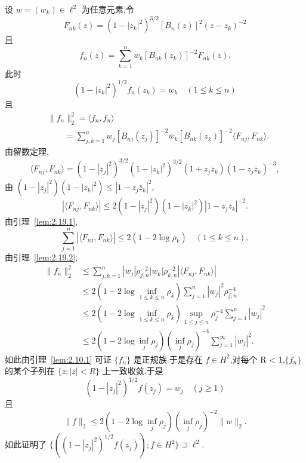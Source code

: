 设 $w = (w_{k}) \in \ell^{2}$ 为任意元素,令
\begin{equation*}
F_{nk}(z) = (1 - |z_{k}|^{2})^{3/2}[B_{n}(z)]^{2}(z - z_{k})^{-2}
\end{equation*}
且
\begin{equation*}
f_{n}(z) = \sum_{k=1}^{n} w_{k}[B_{nk}(z_{k})]^{-2}F_{nk}(z).
\end{equation*}
此时
\begin{equation*}
(1 - |z_{k}|^{2})^{1/2}f_{n}(z_{k}) = w_{k} \quad (1 \leq k \leq n)
\end{equation*}
且
\begin{align*}
& \|f_{n}\|_{2}^{2} = \langle f_{n}, f_{n} \rangle \\
& \qquad = \sum_{j,k=1}^{n} w_{j}[B_{nj}(z_{j})]^{-2}\bar{w}_{k}[\overline{B_{nk}}(z_{k})]^{-2}\langle F_{nj}, F_{nk} \rangle .
\end{align*}
由留数定理,
\begin{equation*}
\langle F_{nj}, F_{nk} \rangle = (1 - |z_{j}|^{2})^{3/2}(1 - |z_{k}|^{2})^{3/2}(1 + z_{j}\bar{z}_{k})(1 - z_{j}\bar{z}_{k})^{-3},
\end{equation*}
由 $(1 - |z_{j}|^{2})(1 - |z_{k}|^{2}) \leq |1 - z_{j}\bar{z}_{k}|^{2}$,
\begin{equation*}
|\langle F_{nj}, F_{nk} \rangle| \leq 2(1 - |z_{j}|^{2})(1 - |z_{k}|^{2})|1 - z_{j}\bar{z}_{k}|^{-2}.
\end{equation*}
由引理~\ref{lem:2.19.1},
\begin{equation*}
\sum_{j=1}^{n}|\langle F_{nj}, F_{nk} \rangle| \leq 2(1 - 2\log\rho_{k}) \quad (1 \leq k \leq n),
\end{equation*}
由引理~\ref{lem:2.19.2},
\begin{align*}
\|f_{n}\|_{2}^{2} &\leq \sum_{j,k=1}^{n}|w_{j}|\rho_{j,n}^{-2}|w_{k}|\rho_{k,n}^{-2}|\langle F_{nj}, F_{nk} \rangle| \\
&\leq 2(1 - 2\log\inf_{1 \leq k \leq n}\rho_{k})\sum_{j=1}^{n}|w_{j}|^{2}\rho_{j,n}^{-4} \\
&\leq 2(1 - 2\log\inf_{1 \leq k \leq n}\rho_{k})\sup_{1 \leq j \leq n}\rho_{j}^{-4}\sum_{j=1}^{n}|w_{j}|^{2} \\
&\leq 2(1 - 2\log\inf_{j}\rho_{j})(\inf_{j}\rho_{j})^{-4}\sum_{j=1}^{\infty}|w_{j}|^{2}.
\end{align*}
如此由引理~\ref{lem:2.10.1} 可证 $\{f_{n}\}$ 是正规族.于是存在 $f \in H^{2}$,对每个 R < 1,$\{f_{n}\}$ 的某个子列在 $\{z; |z| < R\}$ 上一致收敛.于是
\begin{equation*}
(1 - |z_{j}|^{2})^{1/2}f(z_{j}) = w_{j} \quad (j \geq 1)
\end{equation*}
且
\begin{equation*}
\|f\|_{2} \leq 2(1 - 2\log\inf_{j}\rho_{j})(\inf_{j}\rho_{j})^{-2}\|w\|_{2}.
\end{equation*}
如此证明了 $\{((1 - |z_{j}|^{2})^{1/2}f(z_{j})); f \in H^{2}\} \supset \ell^{2}$.

